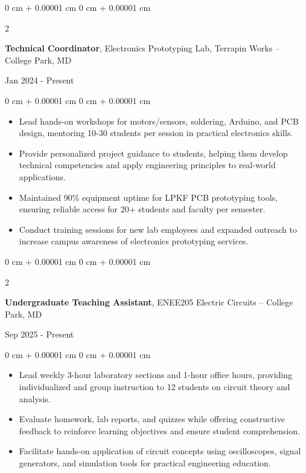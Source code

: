 \documentclass[10pt, letterpaper]{article}
\newenvironment{highlights}{
    \begin{itemize}[
        topsep=0.05 cm,
        parsep=0.05 cm,
        partopsep=0pt,
        itemsep=0pt,
        leftmargin=0 cm + 10pt
    ]
}{
    \end{itemize}
}
\newenvironment{onecolentry}{
    \begin{adjustwidth}{
        0 cm + 0.00001 cm
    }{
        0 cm + 0.00001 cm
    }
}{
    \end{adjustwidth}
}
\newenvironment{twocolentry}[2][]{
    \onecolentry
    \def\secondColumn{#2}
    \setcolumnwidth{\fill, 4.5 cm}
    \begin{paracol}{2}
}{
    \switchcolumn \raggedleft \secondColumn
    \end{paracol}
    \endonecolentry
}
\begin{document}
    \begin{twocolentry}{
        Jan 2024 - Present
    }
        \textbf{Technical Coordinator}, Electronics Prototyping Lab, Terrapin Works -- College Park, MD
    \end{twocolentry}
    \vspace{0.05 cm}
    \begin{onecolentry}
        \begin{highlights}
            \item Lead hands-on workshops for motors/sensors, soldering, Arduino, and PCB design, mentoring 10-30 students per session in practical electronics skills.
            \item Provide personalized project guidance to students, helping them develop technical competencies and apply engineering principles to real-world applications.
            \item Maintained 90\% equipment uptime for LPKF PCB prototyping tools, ensuring reliable access for 20+ students and faculty per semester.
            \item Conduct training sessions for new lab employees and expanded outreach to increase campus awareness of electronics prototyping services.
        \end{highlights}
    \end{onecolentry}

    \vspace{0.10 cm}

    \begin{twocolentry}{
        Sep 2025 - Present
    }
        \textbf{Undergraduate Teaching Assistant}, ENEE205 Electric Circuits -- College Park, MD
    \end{twocolentry}
    \vspace{0.05 cm}
    \begin{onecolentry}
        \begin{highlights}
            \item Lead weekly 3-hour laboratory sections and 1-hour office hours, providing individualized and group instruction to 12 students on circuit theory and analysis.
            \item Evaluate homework, lab reports, and quizzes while offering constructive feedback to reinforce learning objectives and ensure student comprehension.
            \item Facilitate hands-on application of circuit concepts using oscilloscopes, signal generators, and simulation tools for practical engineering education.
        \end{highlights}
    \end{onecolentry}
\end{document}
